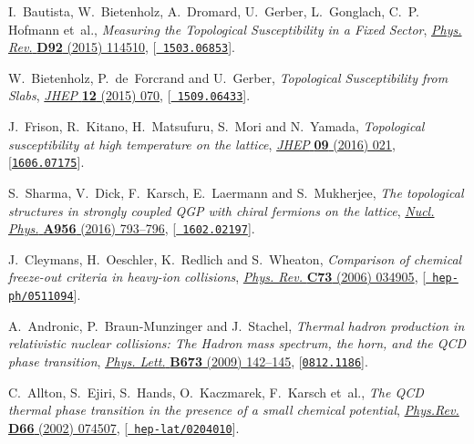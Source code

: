 \documentclass{PoS}
\begin{document}
\begin{thebibliography}{100}
I.~Bautista, W.~Bietenholz, A.~Dromard, U.~Gerber, L.~Gonglach, C.~P. Hofmann
  et~al., \emph{{Measuring the Topological Susceptibility in a Fixed Sector}},
  \href{http://dx.doi.org/10.1103/PhysRevD.92.114510}{\emph{Phys. Rev.} {\bf
  D92} (2015) 114510}, [\href{https://arxiv.org/abs/1503.06853}{{\tt
  1503.06853}}].

W.~Bietenholz, P.~de~Forcrand and U.~Gerber, \emph{{Topological Susceptibility
  from Slabs}}, \href{http://dx.doi.org/10.1007/JHEP12(2015)070}{\emph{JHEP}
  {\bf 12} (2015) 070}, [\href{https://arxiv.org/abs/1509.06433}{{\tt
  1509.06433}}].

J.~Frison, R.~Kitano, H.~Matsufuru, S.~Mori and N.~Yamada, \emph{{Topological
  susceptibility at high temperature on the lattice}},
  \href{http://dx.doi.org/10.1007/JHEP09(2016)021}{\emph{JHEP} {\bf 09} (2016)
  021}, [\href{https://arxiv.org/abs/1606.07175}{{\tt 1606.07175}}].

S.~Sharma, V.~Dick, F.~Karsch, E.~Laermann and S.~Mukherjee, \emph{{The
  topological structures in strongly coupled QGP with chiral fermions on the
  lattice}},
  \href{http://dx.doi.org/10.1016/j.nuclphysa.2016.02.013}{\emph{Nucl. Phys.}
  {\bf A956} (2016) 793--796}, [\href{https://arxiv.org/abs/1602.02197}{{\tt
  1602.02197}}].

J.~Cleymans, H.~Oeschler, K.~Redlich and S.~Wheaton, \emph{{Comparison of
  chemical freeze-out criteria in heavy-ion collisions}},
  \href{http://dx.doi.org/10.1103/PhysRevC.73.034905}{\emph{Phys. Rev.} {\bf
  C73} (2006) 034905}, [\href{https://arxiv.org/abs/hep-ph/0511094}{{\tt
  hep-ph/0511094}}].

A.~Andronic, P.~Braun-Munzinger and J.~Stachel, \emph{{Thermal hadron
  production in relativistic nuclear collisions: The Hadron mass spectrum, the
  horn, and the QCD phase transition}},
  \href{http://dx.doi.org/10.1016/j.physletb.2009.02.014,
  10.1016/j.physletb.2009.06.021}{\emph{Phys. Lett.} {\bf B673} (2009)
  142--145}, [\href{https://arxiv.org/abs/0812.1186}{{\tt 0812.1186}}].

C.~Allton, S.~Ejiri, S.~Hands, O.~Kaczmarek, F.~Karsch et~al., \emph{{The QCD
  thermal phase transition in the presence of a small chemical potential}},
  \href{http://dx.doi.org/10.1103/PhysRevD.66.074507}{\emph{Phys.Rev.} {\bf
  D66} (2002) 074507}, [\href{https://arxiv.org/abs/hep-lat/0204010}{{\tt
  hep-lat/0204010}}].


\end{thebibliography}
\end{document}
